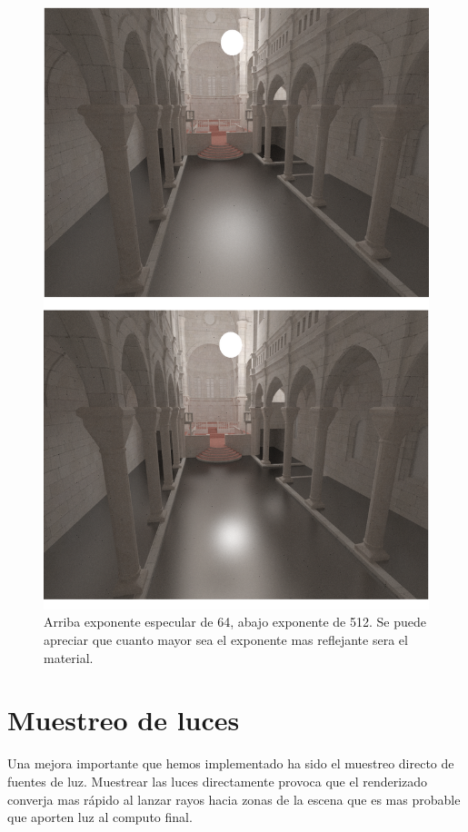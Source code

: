 \begin{figure}
\centering
\includegraphics[width=5in]{compare_specular2_burned.png}
\caption{Arriba exponente especular de 64, abajo exponente de 512. Se puede apreciar que cuanto mayor sea el exponente mas reflejante sera el material.}
\end{figure}

\clearpage

\section{Muestreo de luces}

Una mejora importante que hemos implementado ha sido el muestreo directo de fuentes de luz. Muestrear las luces directamente provoca que el renderizado converja mas rápido al lanzar rayos hacia zonas de la escena que es mas probable que aporten luz al computo final.

